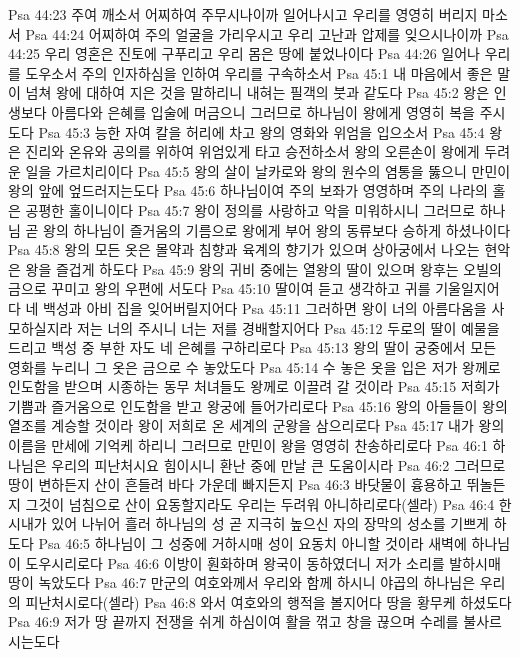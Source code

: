 Psa 44:23  주여 깨소서 어찌하여 주무시나이까 일어나시고 우리를 영영히 버리지 마소서
Psa 44:24  어찌하여 주의 얼굴을 가리우시고 우리 고난과 압제를 잊으시나이까
Psa 44:25  우리 영혼은 진토에 구푸리고 우리 몸은 땅에 붙었나이다
Psa 44:26  일어나 우리를 도우소서 주의 인자하심을 인하여 우리를 구속하소서
Psa 45:1  내 마음에서 좋은 말이 넘쳐 왕에 대하여 지은 것을 말하리니 내혀는 필객의 붓과 같도다
Psa 45:2  왕은 인생보다 아름다와 은혜를 입술에 머금으니 그러므로 하나님이 왕에게 영영히 복을 주시도다
Psa 45:3  능한 자여 칼을 허리에 차고 왕의 영화와 위엄을 입으소서
Psa 45:4  왕은 진리와 온유와 공의를 위하여 위엄있게 타고 승전하소서 왕의 오른손이 왕에게 두려운 일을 가르치리이다
Psa 45:5  왕의 살이 날카로와 왕의 원수의 염통을 뚫으니 만민이 왕의 앞에 엎드러지는도다
Psa 45:6  하나님이여 주의 보좌가 영영하며 주의 나라의 홀은 공평한 홀이니이다
Psa 45:7  왕이 정의를 사랑하고 악을 미워하시니 그러므로 하나님 곧 왕의 하나님이 즐거움의 기름으로 왕에게 부어 왕의 동류보다 승하게 하셨나이다
Psa 45:8  왕의 모든 옷은 몰약과 침향과 육계의 향기가 있으며 상아궁에서 나오는 현악은 왕을 즐겁게 하도다
Psa 45:9  왕의 귀비 중에는 열왕의 딸이 있으며 왕후는 오빌의 금으로 꾸미고 왕의 우편에 서도다
Psa 45:10  딸이여 듣고 생각하고 귀를 기울일지어다 네 백성과 아비 집을 잊어버릴지어다
Psa 45:11  그러하면 왕이 너의 아름다움을 사모하실지라 저는 너의 주시니 너는 저를 경배할지어다
Psa 45:12  두로의 딸이 예물을 드리고 백성 중 부한 자도 네 은혜를 구하리로다
Psa 45:13  왕의 딸이 궁중에서 모든 영화를 누리니 그 옷은 금으로 수 놓았도다
Psa 45:14  수 놓은 옷을 입은 저가 왕께로 인도함을 받으며 시종하는 동무 처녀들도 왕께로 이끌려 갈 것이라
Psa 45:15  저희가 기쁨과 즐거움으로 인도함을 받고 왕궁에 들어가리로다
Psa 45:16  왕의 아들들이 왕의 열조를 계승할 것이라 왕이 저희로 온 세계의 군왕을 삼으리로다
Psa 45:17  내가 왕의 이름을 만세에 기억케 하리니 그러므로 만민이 왕을 영영히 찬송하리로다
Psa 46:1  하나님은 우리의 피난처시요 힘이시니 환난 중에 만날 큰 도움이시라
Psa 46:2  그러므로 땅이 변하든지 산이 흔들려 바다 가운데 빠지든지
Psa 46:3  바닷물이 흉용하고 뛰놀든지 그것이 넘침으로 산이 요동할지라도 우리는 두려워 아니하리로다(셀라)
Psa 46:4  한 시내가 있어 나뉘어 흘러 하나님의 성 곧 지극히 높으신 자의 장막의 성소를 기쁘게 하도다
Psa 46:5  하나님이 그 성중에 거하시매 성이 요동치 아니할 것이라 새벽에 하나님이 도우시리로다
Psa 46:6  이방이 훤화하며 왕국이 동하였더니 저가 소리를 발하시매 땅이 녹았도다
Psa 46:7  만군의 여호와께서 우리와 함께 하시니 야곱의 하나님은 우리의 피난처시로다(셀라)
Psa 46:8  와서 여호와의 행적을 볼지어다 땅을 황무케 하셨도다
Psa 46:9  저가 땅 끝까지 전쟁을 쉬게 하심이여 활을 꺾고 창을 끊으며 수레를 불사르시는도다

